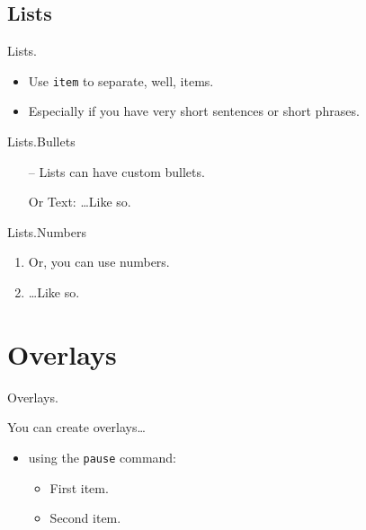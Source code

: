 \documentclass{beamer}	%
\begin{document}
\subsection{Lists}

\begin{frame}{Lists.}{}
	\begin{itemize}
		\item Use \texttt{item} to separate, well, items.
		\item Especially if you have very short sentences or short phrases.
	\end{itemize}
\end{frame} 

\begin{frame}{Lists.}{Bullets}
	\begin{itemize}
		\item[--]Lists can have custom bullets.
		\item[Or Text:] \ldots Like so.
	\end{itemize}
\end{frame}

\begin{frame}{Lists.}{Numbers}
	\begin{enumerate}
		\item Or, you can use numbers.
		\item \ldots Like so.
	\end{enumerate}
\end{frame}

\section{Overlays}
\begin{frame}{Overlays.}

  You can create overlays\dots
  \begin{itemize}
  \item using the \texttt{pause} command:
    \begin{itemize}
    \item
      First item.
      \pause
    \item    
      Second item.
    \end{itemize}
  \end{itemize}
\end{frame}
\end{document}
